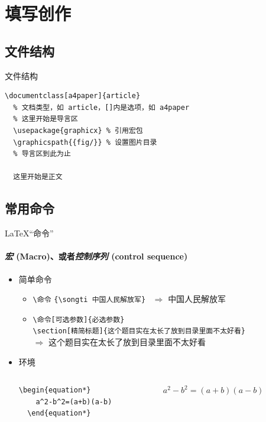 \section{填写创作}

\subsection{文件结构}

\begin{frame}[fragile]{文件结构}
    \lstset{language=[LaTeX]TeX}
    \begin{lstlisting}[basicstyle=\ttfamily]
  \documentclass[a4paper]{article}
  % 文档类型，如 article，[]内是选项，如 a4paper
  % 这里开始是导言区
  \usepackage{graphicx} % 引用宏包
  \graphicspath{{fig/}} % 设置图片目录
  % 导言区到此为止
  
  这里开始是正文
  \end{lstlisting}
  \end{frame}

\subsection{常用命令}
  
\begin{frame}[fragile]{\LaTeX“命令”}
    \framesubtitle{\emph{宏} (Macro)、或者\emph{控制序列} (control sequence)}
  \begin{itemize}
  \item 简单命令
    \begin{itemize}
      \item \verb|\命令|\hspace{2em}
      \verb|{\songti 中国人民解放军}| ~$\Rightarrow$ {\songti 中国人民解放军}
    \item \verb|\命令[可选参数]{必选参数}|\\
  \verb|\section[精简标题]{这个题目实在太长了放到目录里面不太好看}|\\
  $\Rightarrow$ { \hspace{1em} \songti 这个题目实在太长了放到目录里面不太好看}
    \end{itemize}
  \item 环境
    \begin{columns}[c]
    \begin{column}{0.45\textwidth}
      \begin{lstlisting}[basicstyle=\ttfamily]
  \begin{equation*}
    a^2-b^2=(a+b)(a-b)
  \end{equation*}\end{lstlisting}
  \end{column}\hspace{1em}
    \begin{column}{0.45\textwidth}
  $ a^2-b^2=(a+b)(a-b)$
  \end{column}
    \end{columns}
  \end{itemize}
  \end{frame}
  
